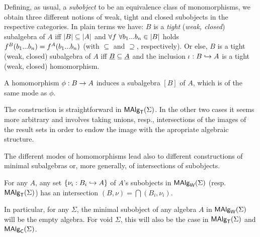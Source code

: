 \documentclass[10pt]{article}
\begin{document}
Defining, as usual, a {\em subobject\/} to be an equivalence class of
monomorphisms, we obtain three different notions of weak, tight and
closed subobjects in the respective categories.  In plain terms 
we have: $B$ is a {\em
tight} ({\em weak, closed\/}) subalgebra of $A$ %
iff $|B|\subseteq|A|$ and $\forall f\ \forall b_{1}...b_{n}\in|B|$
holds $f^B(b_{1}...b_{n})=f^A(b_{1}...b_{n})$ (with $\subseteq$ and $\supseteq$, respectively).
Or else, $B$ is a tight (weak, closed) subalgebra of $A$ iff
$\underline {B}\subseteq\underline {A}$ and the inclusion $\iota:B\hookrightarrow A$ is a
tight (weak, closed) homomorphism.



\begin{Prop}
\label{le:subalgs}
A homomorphism $\phi:B\rightarrow A$ induces a subalgebra $[B]$ of $A$,
which is of the same mode as $\phi$.
\end{Prop}

\noindent
The construction is straightforward in $\mbox{\rm\sf MAlg}_{\sf T}(\Sigma)$. In the other two cases
it seems more arbitrary and involves taking unions, resp., intersections of
the images of the result sets in order to endow the image with the 
apropriate algebraic structure.

The different modes of homomorphisms lead also to different
constructions of minimal subalgebras or, more generally, of
intersections of subobjects.

\begin{Prop}
\label{le:MASlintersect}
For any $A$, any set $\{\nu_i: B_i \hookrightarrow A\}$ of $A$'s subobjects in
$\mbox{\rm\sf MAlg}_{\sf W}(\Sigma)$ (resp. $\mbox{\rm\sf MAlg}_{\sf T}(\Sigma)$) has an intersection $(B,\nu)=\bigcap
(B_i,\nu_i)$.
\end{Prop}

\noindent
In particular, for any $\Sigma$, the minimal subobject of any algebra
$A$ in $\mbox{\rm\sf MAlg}_{\sf W}(\Sigma)$ will be the empty algebra. For void $\Sigma$, this
will also be the case in $\mbox{\rm\sf MAlg}_{\sf T}(\Sigma)$ and $\mbox{\rm\sf MAlg}_{\sf C}(\Sigma)$.

\end{document}
